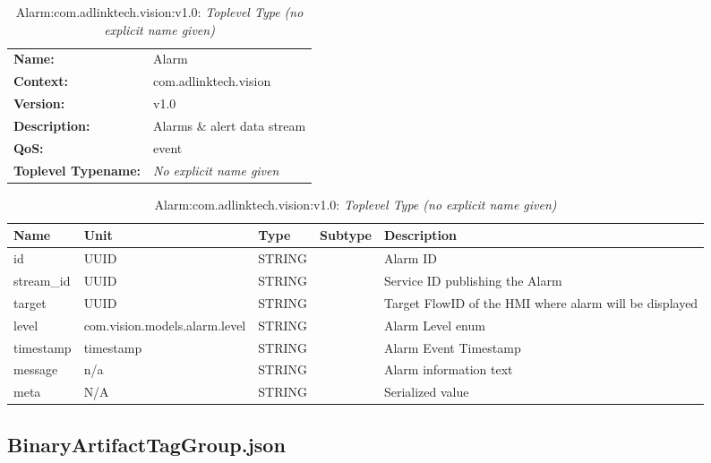 \begin{table}[H]
\begin{tabularx}{\textwidth}{l X} 
       \textbf{Name:} & Alarm \\ 
	   \textbf{Context:} & com.adlinktech.vision \\ 
	   \textbf{Version:} & v1.0 \\ 
	   \textbf{Description:} & Alarms \& alert data stream \\ 
	   \textbf{QoS:} & event \\
	   \textbf{Toplevel Typename:} & \textit{No explicit name given} \\ 
\end{tabularx}
\caption{Alarm:com.adlinktech.vision:v1.0}\label{AlarmTagGroup.json:table:Alarm}
\bigskip
\begin{tabularx}{\textwidth}{l l l l X} 
	 \textbf{Name} & \textbf{Unit} & \textbf{Type} & \textbf{Subtype} & \textbf{Description} \\
	 \midrule
   id & UUID & STRING &  & Alarm ID \\
   stream\_id & UUID & STRING &  & Service ID publishing the Alarm \\
   target & UUID & STRING &  & Target FlowID of the HMI where alarm will be displayed \\
   level & com.vision.models.alarm.level & STRING &  & Alarm Level enum \\
   timestamp & timestamp & STRING &  & Alarm Event Timestamp \\
   message & n/a & STRING &  & Alarm information text \\
   meta & N/A & STRING &  & Serialized value \\
\end{tabularx}
\caption{Alarm:com.adlinktech.vision:v1.0: \textit{Toplevel Type (no explicit name given)}}\label{AlarmTagGroup.json:table:Alarm-no-type-given}


\end{table}

\subsection{BinaryArtifactTagGroup.json}

